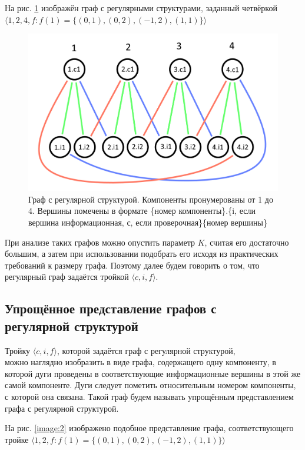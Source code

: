\documentclass[14pt]{mmcs-article}
\begin{document}
На рис. \ref{image:1} изображён граф с регулярными структурами, заданный четвёркой $\langle 1, 2, 4, f: f(1) = \{ (0, 1), (0, 2), (-1, 2), (1, 1) \} \rangle$

\begin{figure}[H]
  \centering
  \includegraphics[scale=0.4]{Fig_1.png}
  \caption{ Граф с регулярной структурой. Компоненты пронумерованы от 1 до 4. Вершины помечены в формате \{номер компоненты\}.\{i, если вершина информационная, с, если проверочная\}\{номер вершины\} }\label{image:1}
\end{figure}

При анализе таких графов можно опустить параметр $K$, считая его достаточно большим, а затем при использовании подобрать его исходя из практических требований к размеру графа. Поэтому далее будем говорить о том, что регулярный граф задаётся тройкой $\langle c, i, f \rangle$.

\subsection{Упрощённое представление графов с\\ регулярной структурой}

Тройку $\langle c, i, f \rangle$, которой задаётся граф с регулярной структурой,\\ можно наглядно изобразить в виде графа, содержащего одну компоненту, в которой дуги проведены в соответствующие информационные вершины в этой же самой компоненте. Дуги следует пометить относительным номером компоненты, с которой она связана. Такой граф будем называть упрощённым представлением графа с регулярной структурой.

На рис. \ref{image:2} изображено подобное представление графа, соответствующего тройке $\langle 1, 2, f: f(1) = \{ (0, 1), (0, 2), (-1, 2), (1, 1) \} \rangle$
\end{document}
